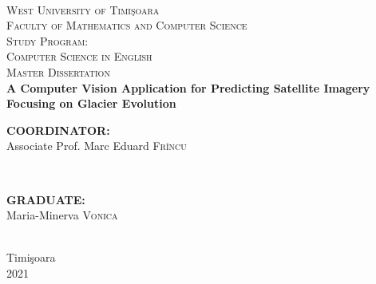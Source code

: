 \documentclass[12pt, a4paper]{report}
\begin{document}
	\begin{titlepage}
		
		\newcommand{\HRule}{\rule{\linewidth}{0.5mm}}
		
		\center
		
		\textsc{}\\[.7cm]
		
		\textsc{\LARGE West University of  Timi\c{s}oara}\\[0.5cm]
		\textsc{\Large Faculty of Mathematics and Computer Science}\\[0.5cm]
		\textsc{\large Study Program: \\Computer Science in English}\\[4.5cm]
		
		\textsc{\Huge Master Dissertation}\\[2cm]
		
		{\Huge \bfseries {A Computer Vision Application for Predicting Satellite Imagery Focusing on Glacier Evolution}}\\[6cm]
		
		\begin{minipage}{0.4\textwidth}
			\begin{flushleft} \large
				\textbf{COORDINATOR:}\\
				Associate Prof. Marc Eduard \textsc{Frîncu}
			\end{flushleft}
		\end{minipage}
		~
		\begin{minipage}{0.4\textwidth}
			\begin{flushright} \large
				\textbf{GRADUATE:} \\
				Maria-Minerva \textsc{Vonica}
			\end{flushright}
		\end{minipage}\\[0.5cm]
		\vfill
		{\large Timi\c{s}oara\\ 2021}\\
		
		\vfill
		
	\end{titlepage}

	
\end{document}

